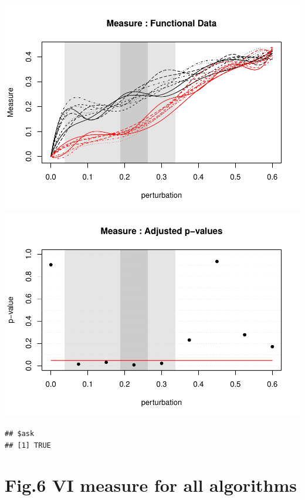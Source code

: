 \documentclass[]{article}
\newenvironment{Shaded}{\begin{snugshade}}{\end{snugshade}}
\newcommand{\KeywordTok}[1]{\textcolor[rgb]{0.13,0.29,0.53}{\textbf{#1}}}
\newcommand{\DataTypeTok}[1]{\textcolor[rgb]{0.13,0.29,0.53}{#1}}
\newcommand{\StringTok}[1]{\textcolor[rgb]{0.31,0.60,0.02}{#1}}
\newcommand{\CommentTok}[1]{\textcolor[rgb]{0.56,0.35,0.01}{\textit{#1}}}
\newcommand{\NormalTok}[1]{#1}
\begin{document}
\includegraphics{Figure_Paper_files/figure-latex/unnamed-chunk-3-1.pdf}
\includegraphics{Figure_Paper_files/figure-latex/unnamed-chunk-3-2.pdf}

\begin{verbatim}
## $ask
## [1] TRUE
\end{verbatim}

\section{Fig.6 VI measure for all
algorithms}\label{fig.6-vi-measure-for-all-algorithms}

\begin{Shaded}
\end{Shaded}
\end{document}
